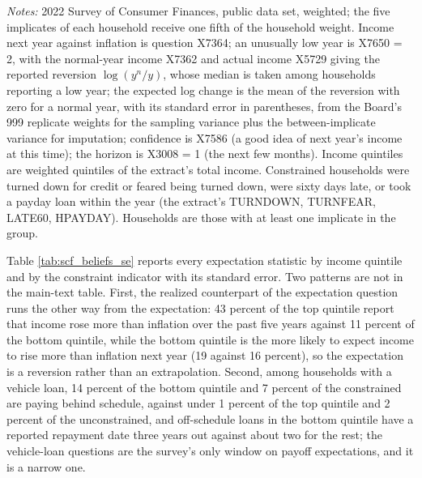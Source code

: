 \begin{table}[H]
\centering
\caption{Beliefs in the Survey of Consumer Finances, by group}
\label{tab:scf_beliefs}
\footnotesize
\resizebox{\textwidth}{!}{}
\vspace{0.5em}
\begin{minipage}{0.95\textwidth}
\small \textit{Notes:} 2022 Survey of Consumer Finances, public data set, weighted; the five implicates of each household receive one fifth of the household weight. Income next year against inflation is question X7364; an unusually low year is X7650 = 2, with the normal-year income X7362 and actual income X5729 giving the reported reversion $\log(y^{n}/y)$, whose median is taken among households reporting a low year; the expected log change is the mean of the reversion with zero for a normal year, with its standard error in parentheses, from the Board's 999 replicate weights for the sampling variance plus the between-implicate variance for imputation; confidence is X7586 (a good idea of next year's income at this time); the horizon is X3008 = 1 (the next few months). Income quintiles are weighted quintiles of the extract's total income. Constrained households were turned down for credit or feared being turned down, were sixty days late, or took a payday loan within the year (the extract's TURNDOWN, TURNFEAR, LATE60, HPAYDAY). Households are those with at least one implicate in the group.
\end{minipage}
\end{table}


Table \ref{tab:scf_beliefs_se} reports every expectation statistic by income quintile and by the constraint indicator with its standard error. Two patterns are not in the main-text table. First, the realized counterpart of the expectation question runs the other way from the expectation: 43 percent of the top quintile report that income rose more than inflation over the past five years against 11 percent of the bottom quintile, while the bottom quintile is the more likely to expect income to rise more than inflation next year (19 against 16 percent), so the expectation is a reversion rather than an extrapolation. Second, among households with a vehicle loan, 14 percent of the bottom quintile and 7 percent of the constrained are paying behind schedule, against under 1 percent of the top quintile and 2 percent of the unconstrained, and off-schedule loans in the bottom quintile have a reported repayment date three years out against about two for the rest; the vehicle-loan questions are the survey's only window on payoff expectations, and it is a narrow one.

